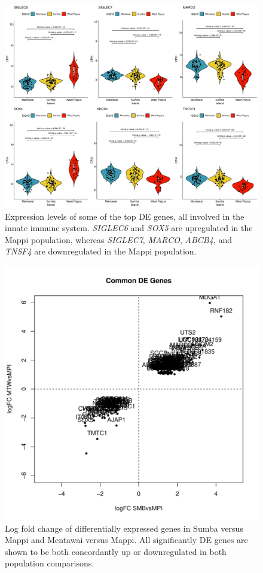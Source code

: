 \documentclass[12pt,a4paper,titlepage,twoside,openright]{book}
\begin{document}
\begin{mainmatter}
{{\begin{figure}[htb!]
\centering
\includegraphics[width=\textwidth,height=\textheight,keepaspectratio]{Figures/favouriteTopGenes_distribution_Island.pdf}
\caption{Expression levels of some of the top DE genes, all involved in the innate immune system. \textit{SIGLEC6} and \textit{SOX5} are upregulated in the Mappi population, whereas \textit{SIGLEC7}, \textit{MARCO}, \textit{ABCB4}, and \textit{TNSF4} are downregulated in the Mappi population.}
\label{fig:top gene distributions}
\end{figure}

\begin{figure}[htb!]
\centering
\includegraphics[width=\textwidth,height=\textheight,keepaspectratio]{Figures/logFC_commonMPIgenes_dupCor.pdf}
\caption{Log fold change of differentially expressed genes in Sumba versus Mappi and Mentawai versus Mappi. All significantly DE genes are shown to be both concordantly up or downregulated in both population comparisons.}
\label{fig:LogFC: Mappi vs Others}
\end{figure}

}}
\end{mainmatter}
\end{document}
